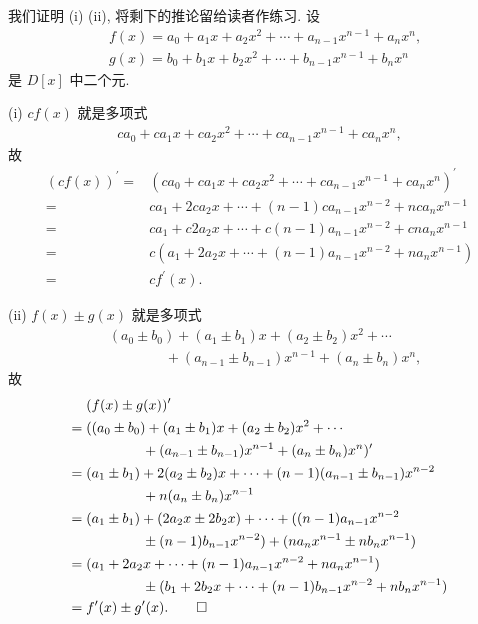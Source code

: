 \begin{pf}
    我们证明 (i) (ii), 将剩下的推论留给读者作练习. 设
    \begin{align*}
         & f(x) = a_0 + a_1 x + a_2 x^2 + \cdots + a_{n-1} x^{n-1} + a_n x^n, \\
         & g(x) = b_0 + b_1 x + b_2 x^2 + \cdots + b_{n-1} x^{n-1} + b_n x^n
    \end{align*}
    是 $D[x]$ 中二个元.

    (i) $cf(x)$ 就是多项式
    \begin{align*}
        ca_0 + ca_1 x + ca_2 x^2 + \cdots + ca_{n-1} x^{n-1} + ca_n x^n,
    \end{align*}
    故
    \begin{align*}
        (cf(x))^{\prime}
        = {} & (ca_0 + ca_1 x + ca_2 x^2 + \cdots + ca_{n-1} x^{n-1} + ca_n x^n)^{\prime} \\
        = {} & ca_1 + 2ca_2 x + \cdots + (n-1)ca_{n-1} x^{n-2} + nca_n x^{n-1}            \\
        = {} & ca_1 + c2a_2 x + \cdots + c(n-1)a_{n-1} x^{n-2} + cna_n x^{n-1}            \\
        = {} & c(a_1 + 2a_2 x + \cdots + (n-1)a_{n-1} x^{n-2} + na_n x^{n-1})             \\
        = {} & cf^{\prime} (x).
    \end{align*}

    (ii) $f(x) \pm g(x)$ 就是多项式
    \begin{align*}
         & (a_0 \pm b_0) + (a_1 \pm b_1) x + (a_2 \pm b_2) x^2 + \cdots       \\
         & \qquad \qquad + (a_{n-1} \pm b_{n-1}) x^{n-1} + (a_n \pm b_n) x^n,
    \end{align*}
    故
    \begin{align*}
             & (f(x) \pm g(x))^{\prime}                                                        \\
        = {} & ((a_0 \pm b_0) + (a_1 \pm b_1) x + (a_2 \pm b_2) x^2 + \cdots                   \\
             & \qquad \qquad + (a_{n-1} \pm b_{n-1}) x^{n-1} + (a_n \pm b_n) x^n)^{\prime}     \\
        = {} & (a_1 \pm b_1) + 2(a_2 \pm b_2) x + \cdots + (n-1) (a_{n-1} \pm b_{n-1}) x^{n-2} \\
             & \qquad \qquad + n (a_n \pm b_n) x^{n-1}                                         \\
        = {} & (a_1 \pm b_1) + (2a_2 x \pm 2b_2 x) + \cdots + ((n-1)a_{n-1} x^{n-2}            \\
             & \qquad \qquad \pm (n-1)b_{n-1} x^{n-2})
        + (na_n x^{n-1} \pm nb_n x^{n-1})                                                      \\
        = {} & (a_1 + 2a_2 x + \cdots + (n-1)a_{n-1} x^{n-2} + na_n x^{n-1})                   \\
             & \qquad \qquad \pm (b_1 + 2b_2 x + \cdots + (n-1)b_{n-1} x^{n-2} + nb_n x^{n-1}) \\
        = {} & f^{\prime} (x) \pm g^{\prime} (x). \qedhere
    \end{align*}
\end{pf}


